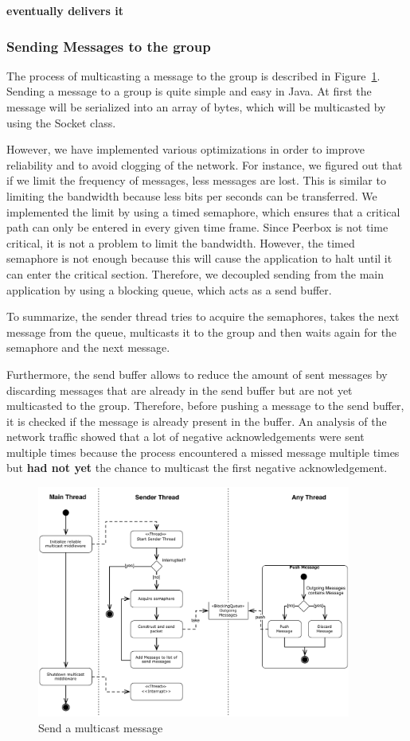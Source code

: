 \textbf{eventually delivers it}

\subsubsection{Sending Messages to the group}

The process of multicasting a message to the group is described in Figure~\ref{fig:sendMessage}. Sending a message to a group is quite simple and easy in Java. At first the message will be serialized into an array of bytes, which will be multicasted by using the Socket class. 

However, we have implemented various optimizations in order to improve reliability and to avoid clogging of the network. For instance, we figured out that if we limit the frequency of messages, less messages are lost. This is similar to limiting the bandwidth because less bits per seconds can be transferred.  
We implemented the limit by using a timed semaphore, which ensures that a critical path can only be entered in every given time frame. Since Peerbox is not time critical, it is not a  problem to limit the bandwidth. 
However, the timed semaphore is not enough because this will cause the application to halt until it can enter the critical section. Therefore, we decoupled  sending from the main application by using a blocking queue, which acts as a send buffer. 

To summarize, the sender thread tries to acquire the semaphores, takes the next message from the queue, multicasts it to the group and then waits again for the semaphore and the next message. 

Furthermore, the send buffer allows to reduce the amount of sent messages by discarding messages that are already in the send buffer but are not yet  multicasted to the group. Therefore, before pushing a message to the send buffer, it is checked if the message is already present in the buffer.
An analysis of the network traffic showed that a lot of negative acknowledgements were sent multiple times because the process encountered a missed message multiple times but \textbf{had not yet}  the chance to multicast the first negative acknowledgement. 

\begin{figure}[htbp]
    \centering
        \includegraphics[height=3in]{figures/sendMessage.pdf}
    \caption{Send a multicast message}
    \label{fig:sendMessage}
\end{figure}
  
